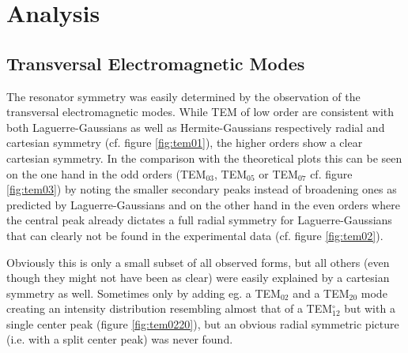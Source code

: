 \documentclass[a4paper]{scrartcl}
\numberwithin{equation}{section}
\numberwithin{figure}{section}
\numberwithin{table}{section}
\begin{document}
\section{Analysis}
\subsection{Transversal Electromagnetic Modes}
The resonator symmetry was easily determined by the observation of the transversal electromagnetic modes. While TEM of low order are consistent with both Laguerre-Gaussians as well as Hermite-Gaussians respectively radial and cartesian symmetry (cf. figure \ref{fig:tem01}), the higher orders show a clear cartesian symmetry. In the comparison with the theoretical plots this can be seen on the one hand in the odd orders (TEM$_{03}$, TEM$_{05}$ or TEM$_{07}$ cf. figure \ref{fig:tem03}) by noting the smaller secondary peaks instead of broadening ones as predicted by Laguerre-Gaussians and on the other hand in the even orders where the central peak already dictates a full radial symmetry for Laguerre-Gaussians that can clearly not be found in the experimental data (cf. figure \ref{fig:tem02}).

Obviously this is only a small subset of all observed forms, but all others (even though they might not have been as clear) were easily explained by a cartesian symmetry as well. Sometimes only by adding eg. a TEM$_{02}$ and a TEM$_{20}$ mode creating an intensity distribution resembling almost that of a TEM$^\circ_{12}$ but with a single center peak (figure \ref{fig:tem0220}), but an obvious radial symmetric picture (i.e. with a split center peak) was never found.

\clearpage
 

\end{document}
